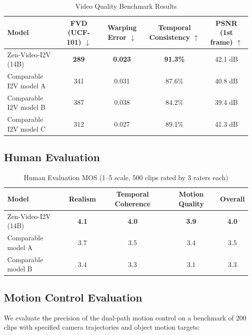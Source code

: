 \documentclass[11pt,a4paper]{article}
\begin{document}
\begin{table}[H]
\centering
\caption{Video Quality Benchmark Results}
\begin{tabular}{lcccc}
\toprule
\textbf{Model} & \textbf{FVD (UCF-101)} $\downarrow$ & \textbf{Warping Error} $\downarrow$ & \textbf{Temporal Consistency} $\uparrow$ & \textbf{PSNR (1st frame)} $\uparrow$ \\
\midrule
Zen-Video-I2V (14B) & \textbf{289} & \textbf{0.023} & \textbf{91.3\%} & 42.1 dB \\
Comparable I2V model A & 341 & 0.031 & 87.6\% & 40.8 dB \\
Comparable I2V model B & 387 & 0.038 & 84.2\% & 39.4 dB \\
Comparable I2V model C & 312 & 0.027 & 89.1\% & 41.3 dB \\
\bottomrule
\end{tabular}
\end{table}

\subsection{Human Evaluation}

\begin{table}[H]
\centering
\caption{Human Evaluation MOS (1--5 scale, 500 clips rated by 3 raters each)}
\begin{tabular}{lcccc}
\toprule
\textbf{Model} & \textbf{Realism} & \textbf{Temporal Coherence} & \textbf{Motion Quality} & \textbf{Overall} \\
\midrule
Zen-Video-I2V (14B) & \textbf{4.1} & \textbf{4.0} & \textbf{3.9} & \textbf{4.0} \\
Comparable model A & 3.7 & 3.5 & 3.4 & 3.5 \\
Comparable model B & 3.4 & 3.3 & 3.1 & 3.3 \\
\bottomrule
\end{tabular}
\end{table}

\subsection{Motion Control Evaluation}

We evaluate the precision of the dual-path motion control on a benchmark of 200 clips with specified camera trajectories and object motion targets:
\end{document}
